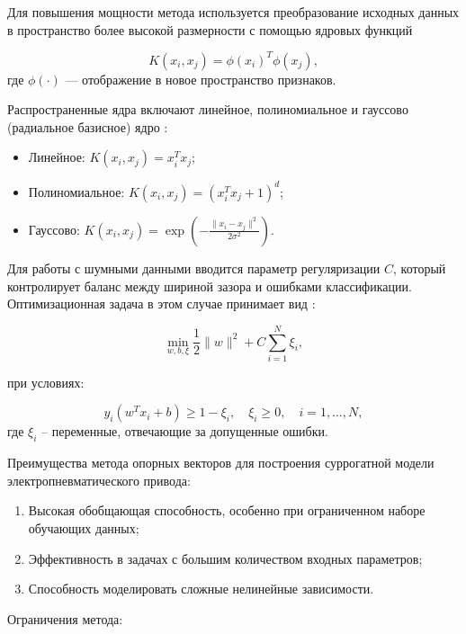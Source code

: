 Для повышения мощности метода используется преобразование исходных данных
в пространство более высокой размерности с помощью ядровых
функций

\begin{equation*}
    K(x_i, x_j) = \phi(x_i)^T \phi(x_j),
\end{equation*}
где $\phi(\cdot)$ — отображение в новое
пространство признаков.

Распространенные ядра включают линейное,
полиномиальное и гауссово (радиальное базисное) ядро \cite{Deris2011}:

\begin{itemize}
    \item Линейное: $K(x_i, x_j) = x_i^T x_j$;
    \item Полиномиальное: $K(x_i, x_j) = (x_i^T x_j + 1)^d$;
    \item Гауссово: $K(x_i, x_j) = \exp\left(-\frac{\|x_i - x_j\|^2}{2\sigma^2}\right)$.
\end{itemize}

Для работы с шумными данными вводится параметр регуляризации $C$,
который контролирует баланс между шириной зазора и ошибками классификации.
Оптимизационная задача в этом случае принимает вид \cite{Boswell2002}:

\begin{equation*}
    \min_{w, b, \xi} \frac{1}{2} \|w\|^2 + C \sum_{i=1}^N \xi_i,
\end{equation*}

при условиях:

\begin{equation*}
    y_i (w^T x_i + b) \geq 1 - \xi_i, \quad \xi_i \geq 0, \quad i = 1, \ldots, N,
\end{equation*}
где $\xi_i$ -- переменные, отвечающие за допущенные ошибки.

Преимущества метода опорных векторов для построения суррогатной модели электропневматического привода:

\begin{enumerate}
    \item Высокая обобщающая способность, особенно при ограниченном наборе обучающих данных;
    \item Эффективность в задачах с большим количеством входных параметров;
    \item Способность моделировать сложные нелинейные зависимости.
\end{enumerate}

Ограничения метода:

